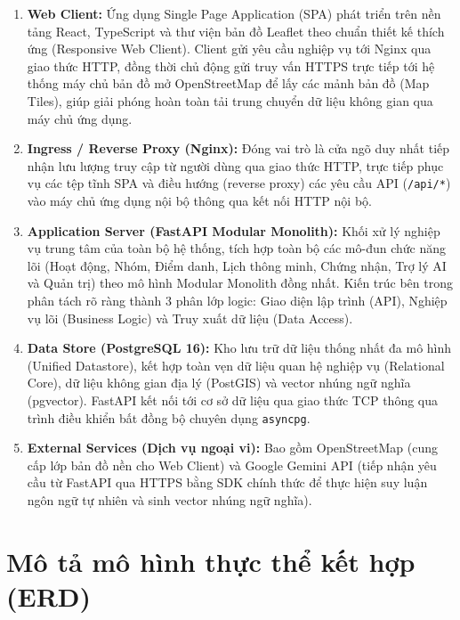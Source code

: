 \begin{enumerate}[label=\textbf{\arabic*.}]
    \item \textbf{Web Client:} Ứng dụng Single Page Application (SPA) phát triển trên nền tảng React, TypeScript và thư viện bản đồ Leaflet theo chuẩn thiết kế thích ứng (Responsive Web Client). Client gửi yêu cầu nghiệp vụ tới Nginx qua giao thức HTTP, đồng thời chủ động gửi truy vấn HTTPS trực tiếp tới hệ thống máy chủ bản đồ mở OpenStreetMap để lấy các mảnh bản đồ (Map Tiles), giúp giải phóng hoàn toàn tải trung chuyển dữ liệu không gian qua máy chủ ứng dụng.

    \item \textbf{Ingress / Reverse Proxy (Nginx):} Đóng vai trò là cửa ngõ duy nhất tiếp nhận lưu lượng truy cập từ người dùng qua giao thức HTTP, trực tiếp phục vụ các tệp tĩnh SPA và điều hướng (reverse proxy) các yêu cầu API (\texttt{/api/*}) vào máy chủ ứng dụng nội bộ thông qua kết nối HTTP nội bộ.

    \item \textbf{Application Server (FastAPI Modular Monolith):} Khối xử lý nghiệp vụ trung tâm của toàn bộ hệ thống, tích hợp toàn bộ các mô-đun chức năng lõi (Hoạt động, Nhóm, Điểm danh, Lịch thông minh, Chứng nhận, Trợ lý AI và Quản trị) theo mô hình Modular Monolith đồng nhất. Kiến trúc bên trong phân tách rõ ràng thành 3 phân lớp logic: Giao diện lập trình (API), Nghiệp vụ lõi (Business Logic) và Truy xuất dữ liệu (Data Access).

    \item \textbf{Data Store (PostgreSQL 16):} Kho lưu trữ dữ liệu thống nhất đa mô hình (Unified Datastore), kết hợp toàn vẹn dữ liệu quan hệ nghiệp vụ (Relational Core), dữ liệu không gian địa lý (PostGIS) và vector nhúng ngữ nghĩa (pgvector). FastAPI kết nối tới cơ sở dữ liệu qua giao thức TCP thông qua trình điều khiển bất đồng bộ chuyên dụng \texttt{asyncpg}.

    \item \textbf{External Services (Dịch vụ ngoại vi):} Bao gồm OpenStreetMap (cung cấp lớp bản đồ nền cho Web Client) và Google Gemini API (tiếp nhận yêu cầu từ FastAPI qua HTTPS bằng SDK chính thức để thực hiện suy luận ngôn ngữ tự nhiên và sinh vector nhúng ngữ nghĩa).
\end{enumerate}

\section{Mô tả mô hình thực thể kết hợp (ERD)}

